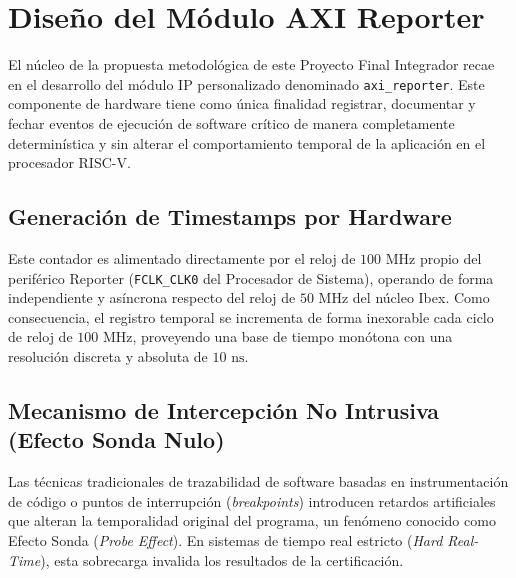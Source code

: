 \section{Diseño del Módulo AXI Reporter}
\label{sec:axi_reporter}

El núcleo de la propuesta metodológica de este Proyecto Final Integrador recae en el desarrollo del módulo IP personalizado denominado \texttt{axi\_reporter}. Este componente de hardware tiene como única finalidad registrar, documentar y fechar eventos de ejecución de software crítico de manera completamente determinística y sin alterar el comportamiento temporal de la aplicación en el procesador RISC-V.

\subsection{Generación de Timestamps por Hardware}
\label{ssec:timestamps_hw}

Este contador es alimentado directamente por el reloj de
$100\text{ MHz}$ propio del periférico Reporter (\texttt{FCLK\_CLK0} del Procesador de Sistema), operando de forma independiente y asíncrona respecto del reloj de $50\text{ MHz}$ del núcleo Ibex. Como consecuencia, el registro temporal se incrementa de forma inexorable cada ciclo de reloj de $100\text{ MHz}$, proveyendo una base de tiempo monótona con una resolución discreta y absoluta de $10\text{ ns}$.

\subsection{Mecanismo de Intercepción No Intrusiva (Efecto Sonda Nulo)}
\label{ssec:efecto_sonda_nulo}

Las técnicas tradicionales de trazabilidad de software basadas en instrumentación de código o puntos de interrupción (\textit{breakpoints}) introducen retardos artificiales que alteran la temporalidad original del programa, un fenómeno conocido como Efecto Sonda (\textit{Probe Effect}). En sistemas de tiempo real estricto (\textit{Hard Real-Time}), esta sobrecarga invalida los resultados de la certificación.

